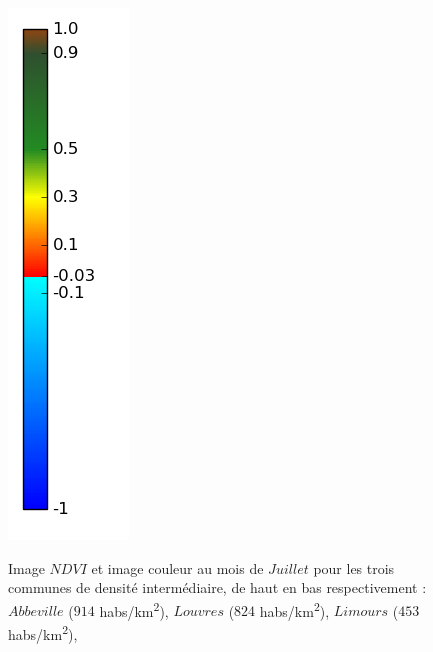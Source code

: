 \documentclass{book}
\begin{document}
\begin{figure}[H]
{\includegraphics[scale=0.3]{../3_ndvi/images/colormap.png}
}
\caption{Image $NDVI$ et image couleur au mois de $Juillet$ pour les trois communes de densité intermédiaire, de haut en bas respectivement :
$Abbeville$ ($914$ habs/km\textsuperscript{2}),
$Louvres$ ($824$ habs/km\textsuperscript{2}),
$Limours$ ($453$ habs/km\textsuperscript{2}),
}
\label{ndvi_cat2}
\end{figure}
\clearpage
\end{document}
